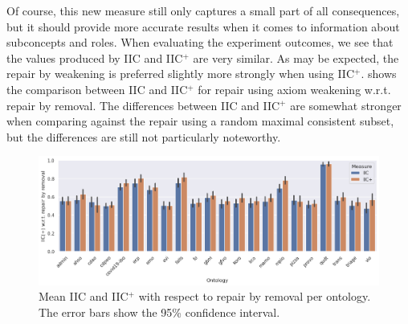 Of course, this new measure still only captures a small part of all consequences, but it should provide more accurate results when it comes to information about subconcepts and roles. When evaluating the experiment outcomes, we see that the values produced by IIC and IIC$^+$ are very similar. As may be expected, the repair by weakening is preferred slightly more strongly when using IIC$^+$.  shows the comparison between IIC and IIC$^+$ for repair using axiom weakening w.r.t. repair by removal. The differences between IIC and IIC$^+$ are somewhat stronger when comparing against the repair using a random maximal consistent subset, but the differences are still not particularly noteworthy.

\begin{figure}[ht]
  \centering
  \includegraphics[width=\textwidth]{resources/iic-eiic-ontology-bar.png}
  \caption{Mean IIC and IIC$^+$ with respect to repair by removal per ontology. The error bars show the 95\% confidence interval.}
  \label{fig:results-eiic}
\end{figure}
